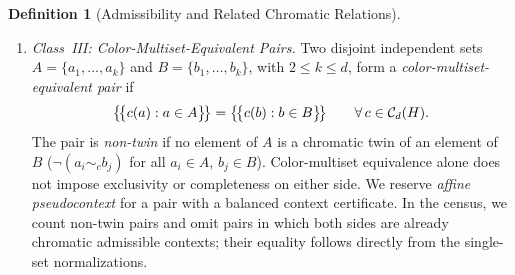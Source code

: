 \documentclass[aps,pra,reprint,superscriptaddress,longbibliography,nofootinbib,floatfix,10pt]{revtex4-2}
\theoremstyle{definition}\newtheorem{definition}[theorem]{Definition}
\theoremstyle{remark}\newtheorem{remark}[theorem]{Remark}
\begin{document}
\begin{definition}[Admissibility and Related Chromatic Relations]
\begin{enumerate}
\item \emph{Class~III: Color-Multiset-Equivalent Pairs.} Two disjoint independent sets $A=\{a_1,\ldots,a_k\}$ and $B=\{b_1,\ldots,b_k\}$, with $2\le k\le d$, form a \emph{color-multiset-equivalent pair} if
\begin{equation}\label{eq:def-paired-multiset}
\bigl\{\!\bigl\{c(a):a\in A\bigr\}\!\bigr\} = \bigl\{\!\bigl\{c(b):b\in B\bigr\}\!\bigr\} \qquad \forall\, c\in\mathcal C_d(H).
\end{equation}
The pair is \emph{non-twin} if no element of $A$ is a chromatic twin of an element of $B$ ($\neg(a_i\sim_c b_j)$ for all $a_i\in A$, $b_j\in B$). Color-multiset equivalence alone does not impose exclusivity or completeness on either side. We reserve \emph{affine pseudocontext} for a pair with a balanced context certificate. In the census, we count non-twin pairs and omit pairs in which both sides are already chromatic admissible contexts; their equality follows directly from the single-set normalizations.
\end{enumerate}
\end{definition}
\end{document}
